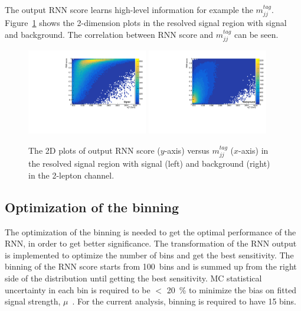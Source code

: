 The output RNN score learns high-level information for example the $m_{jj}^{tag}$. 
Figure~\ref{fig:2Dplot} shows the 2-dimension plots in the resolved signal region with signal and background. The correlation between RNN score and $m_{jj}^{tag}$ can be seen.
\begin{figure}[htbp]
    \centering
    \includegraphics[width=0.47\textwidth]{figures/RNN/outputs/j1nTracks2Dsig.pdf}
    \includegraphics[width=0.47\textwidth]{figures/RNN/outputs/j1nTracks2Dbg.pdf}
    \caption{ The 2D plots of output RNN score ($y$-axis) versus $m_{jj}^{tag}$ ($x$-axis) in the resolved signal region with signal (left) and background (right) in the 2-lepton channel. 
    }
    \label{fig:2Dplot}
\end{figure}



\subsection{Optimization of the binning}
The optimization of the binning is needed to get the optimal performance of the RNN, in order to get better significance. 
The transformation of the RNN output \cite{ATL-PHYS-PUB-2019-009} is implemented to optimize the number of bins and get the best sensitivity.
The binning of the RNN score starts from 100~bins and is summed up from the right side of the distribution until getting the best sensitivity. 
MC statistical uncertainty in each bin is required to be $<$ 20~\% to minimize the bias on fitted signal strength, $\mu$~\cite{ATL-PHYS-PUB-2019-009}. 
For the current analysis, binning is required to have 15 bins.
